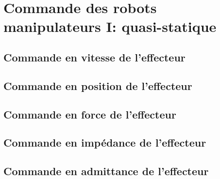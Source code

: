 \chapter{Commande des robots manipulateurs I: quasi-statique}


\section{Commande en vitesse de l'effecteur}

\section{Commande en position de l'effecteur}

\section{Commande en force de l'effecteur}

\section{Commande en impédance de l'effecteur}

\section{Commande en admittance de l'effecteur}